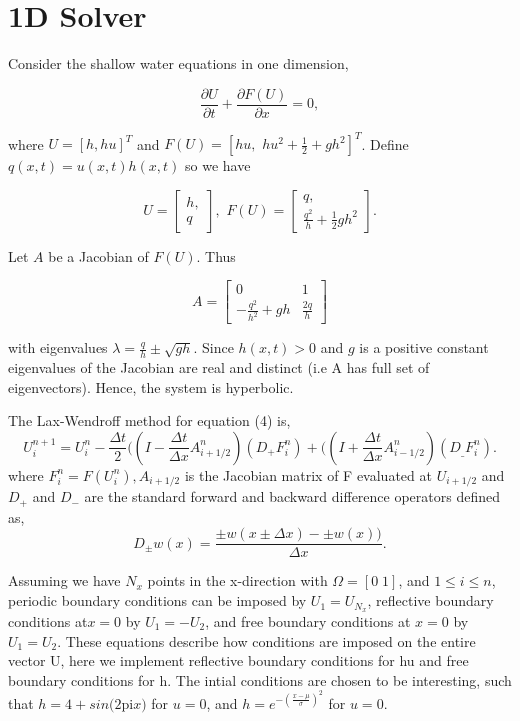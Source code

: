 \section{1D Solver}
\par Consider the shallow water equations in one dimension,

\begin{equation}
\frac{\partial U}{\partial t} + \frac{\partial F(U)}{\partial x} = 0,
\end{equation}

where $U = [h, hu]^T$ and $F(U) = [hu,\,\, hu^2 + \frac{1}{2} + gh^2]^T$. Define $q(x,t) = u(x,t) h(x,t)$ so we have

\[U = \begin{bmatrix} h, \\ q\end{bmatrix},\,\, F(U) = \begin{bmatrix} q,\\ \frac{q^2}{h} + \frac{1}{2} gh^2 \end{bmatrix}.\]

Let $A$ be a Jacobian of $F(U)$. Thus

\begin{equation}
A = \begin{bmatrix} 0 & 1 \\ -\frac{q^2}{h^2} + gh & \frac{2q}{h}\end{bmatrix}
\end{equation}

with eigenvalues $\lambda = \frac{q}{h} \pm \sqrt{gh}.$ Since $h(x,t) > 0$ and $g$ is a positive constant eigenvalues of the Jacobian are
real and distinct (i.e A has full set of eigenvectors). Hence, the system is hyperbolic. \newline

The Lax-Wendroff method for equation (4) is,
\begin{equation}\label{eqn:4}
U_i^{n+1}=U_i^n-\frac{{\Delta t}}{2}((I-\frac{{\Delta t}}{{\Delta x}}A_{i+1/2}^n)(D_+F_i^n)+((I+\frac{{\Delta
t}}{{\Delta x}}A_{i-1/2}^n)(D_{\_}F_i^n).
\end{equation}
where \(F_i^n=F(U_i^n), A_{i+1/2}\) is the Jacobian matrix of F evaluated at \(U_{i+1/2}\) and \(D_+\) and \(D_-\) are the standard forward
and backward difference operators defined as,
\begin{equation}\label{eqn:5}
D_{\pm }w(x)=\frac{\pm w(x\pm {\Delta x})-\pm w(x))}{{\Delta x}}. 
\end{equation}

Assuming we have \(N_x\) points in the x-direction with \(\Omega =[0\;1]\), and \(1\leq i\leq n\), periodic boundary
conditions can be imposed by \(U_1=U_{N_x}\), reflective boundary conditions at\(x=0\) by \(U_1=-U_2\), and free boundary conditions at \(x=0\) by
\(U_1=U_2\). These equations describe how conditions are imposed on the entire vector U, here we implement reflective boundary
conditions for hu and free boundary conditions for h. The intial conditions are chosen to be interesting, such that $h=4+sin(2$pi$x)$ for $u=0$, and
 $h=e^{-(\frac{x-\mu }{\sigma })^2}$ for $u=0$. \newline


